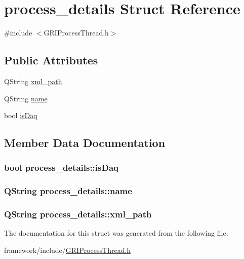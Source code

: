 \hypertarget{structprocess__details}{\section{process\-\_\-details \-Struct \-Reference}
\label{structprocess__details}
}


{\ttfamily \#include $<$\-G\-R\-I\-Process\-Thread.\-h$>$}

\subsection*{\-Public \-Attributes}
\begin{DoxyCompactItemize}
\item 
\-Q\-String \hyperlink{structprocess__details_a6fd279b858377eb5be578d7711a8f90c}{xml\-\_\-path}
\item 
\-Q\-String \hyperlink{structprocess__details_ae13ab4a750108c348263f9cdbb2ff23b}{name}
\item 
bool \hyperlink{structprocess__details_a26445ad974d69ab394ae451ba5f18712}{is\-Daq}
\end{DoxyCompactItemize}


\subsection{\-Member \-Data \-Documentation}
\hypertarget{structprocess__details_a26445ad974d69ab394ae451ba5f18712}{
\subsubsection[{is\-Daq}]{\setlength{\rightskip}{0pt plus 5cm}bool {\bf process\-\_\-details\-::is\-Daq}}}\label{structprocess__details_a26445ad974d69ab394ae451ba5f18712}
\hypertarget{structprocess__details_ae13ab4a750108c348263f9cdbb2ff23b}{
\subsubsection[{name}]{\setlength{\rightskip}{0pt plus 5cm}\-Q\-String {\bf process\-\_\-details\-::name}}}\label{structprocess__details_ae13ab4a750108c348263f9cdbb2ff23b}
\hypertarget{structprocess__details_a6fd279b858377eb5be578d7711a8f90c}{
\subsubsection[{xml\-\_\-path}]{\setlength{\rightskip}{0pt plus 5cm}\-Q\-String {\bf process\-\_\-details\-::xml\-\_\-path}}}\label{structprocess__details_a6fd279b858377eb5be578d7711a8f90c}


\-The documentation for this struct was generated from the following file\-:\begin{DoxyCompactItemize}
\item 
framework/include/\hyperlink{GRIProcessThread_8h}{\-G\-R\-I\-Process\-Thread.\-h}\end{DoxyCompactItemize}
